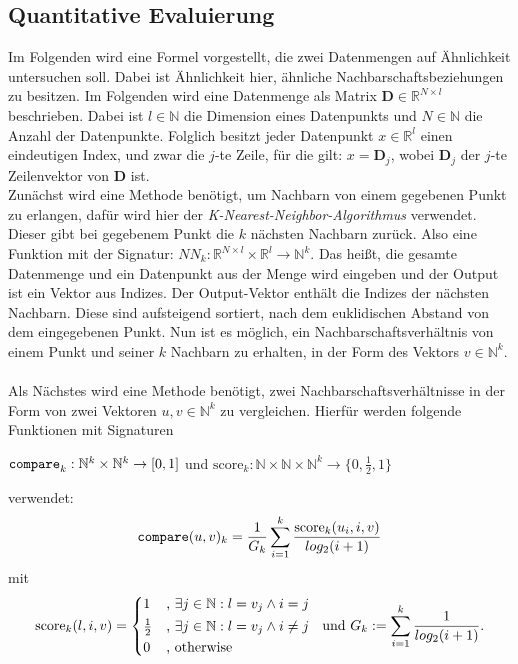 \documentclass[12pt,letterpaper,ngerman]{article}
\begin{document}
\subsection{Quantitative Evaluierung} 
Im Folgenden wird eine Formel vorgestellt, die zwei Datenmengen
auf Ähnlichkeit untersuchen soll. Dabei ist Ähnlichkeit hier,
ähnliche Nachbarschaftsbeziehungen zu besitzen. Im Folgenden wird
eine Datenmenge als Matrix  $\mathbf{D} \in \mathbb{R}^{N\times l}$
beschrieben. Dabei ist $l \in \mathbb{N}$ die Dimension eines Datenpunkts
und $N \in \mathbb{N}$ die Anzahl der Datenpunkte. Folglich besitzt jeder
Datenpunkt $x \in \mathbb{R}^l$ einen eindeutigen Index, und zwar die
$j$-te Zeile, für die gilt: $x = \mathbf{D}_j$,  wobei $\mathbf{D}_j$ 
der $j$-te Zeilenvektor von $\mathbf{D}$ ist.\\ 
Zunächst wird eine Methode benötigt, um Nachbarn von einem gegebenen
Punkt zu erlangen, dafür wird hier der
\textit{K-Nearest-Neighbor-Algorithmus} verwendet. Dieser gibt bei
gegebenem Punkt die $k$ nächsten Nachbarn zurück. Also eine Funktion
mit der Signatur:
$NN_k: \mathbb{R}^{N\times l} \times \mathbb{R}^{l} \to \mathbb{N}^k$. 
Das heißt, die gesamte Datenmenge und ein Datenpunkt aus der Menge
wird eingeben und der Output ist ein Vektor aus Indizes.
Der Output-Vektor enthält die Indizes der nächsten Nachbarn. Diese sind
aufsteigend sortiert, nach dem euklidischen Abstand von dem eingegebenen
Punkt. Nun ist es möglich, ein Nachbarschaftsverhältnis von einem Punkt
und seiner $k$ Nachbarn zu erhalten, in der Form des Vektors
$v \in \mathbb{N}^k$.\\ 
\pagebreak
\hfill\\
Als Nächstes wird eine Methode benötigt, zwei Nachbarschaftsverhältnisse
in der Form von zwei Vektoren $u, v \in \mathbb{N}^k$ zu vergleichen.
Hierfür werden folgende Funktionen mit Signaturen \\
\begin{center}
$\verb|compare|_k:\mathbb{N}^k \times \mathbb{N}^k \to [0,1]$ 
und $\text{score}_k: \mathbb{N} \times \mathbb{N} \times
\mathbb{N}^k \to \{0, \frac{1}{2}, 1\}$
\end{center}
verwendet:
\[
    \verb|compare|(u,v)_k = 
      \frac{1}{G_k} \sum^{k}_{i=1} 
      \frac{ \text{score}_{k}(u_i,i,v)}{log_2(i+1)}
\]
mit
\[
  \text{score}_k(l,i,v) = \begin{cases*} 
      1 & , $\exists j \in \mathbb{N}: l = v_j \land i = j$   \\
      \frac{1}{2} & , $\exists j \in \mathbb{N}: l = v_j \land i \neq j$\\
      0   & , \text{otherwise}
    \end{cases*}  \text{  und  }
    G_k := \sum_{i=1}^{k} \frac{1}{log_2(i+1)}.
\]
\end{document}

